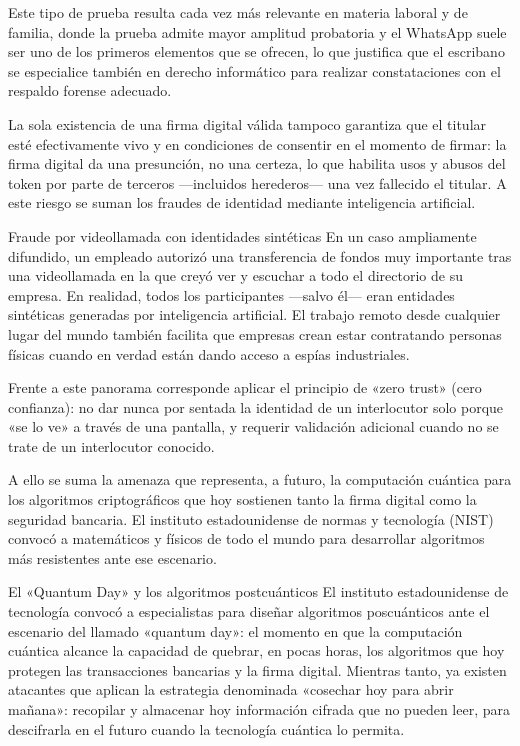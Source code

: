\documentclass[12pt,oneside]{book}
\begin{document}
Este tipo de prueba resulta cada vez más relevante en materia laboral y de familia, donde la prueba admite mayor amplitud probatoria y el WhatsApp suele ser uno de los primeros elementos que se ofrecen, lo que justifica que el escribano se especialice también en derecho informático para realizar constataciones con el respaldo forense adecuado.

La sola existencia de una firma digital válida tampoco garantiza que el titular esté efectivamente vivo y en condiciones de consentir en el momento de firmar: la firma digital da una presunción, no una certeza, lo que habilita usos y abusos del token por parte de terceros ---incluidos herederos--- una vez fallecido el titular. A este riesgo se suman los fraudes de identidad mediante inteligencia artificial.

\begin{example}{Fraude por videollamada con identidades sintéticas}
En un caso ampliamente difundido, un empleado autorizó una transferencia de fondos muy importante tras una videollamada en la que creyó ver y escuchar a todo el directorio de su empresa. En realidad, todos los participantes ---salvo él--- eran entidades sintéticas generadas por inteligencia artificial. El trabajo remoto desde cualquier lugar del mundo también facilita que empresas crean estar contratando personas físicas cuando en verdad están dando acceso a espías industriales.
\end{example}

Frente a este panorama corresponde aplicar el principio de «zero trust» (cero confianza): no dar nunca por sentada la identidad de un interlocutor solo porque «se lo ve» a través de una pantalla, y requerir validación adicional cuando no se trate de un interlocutor conocido.

A ello se suma la amenaza que representa, a futuro, la computación cuántica para los algoritmos criptográficos que hoy sostienen tanto la firma digital como la seguridad bancaria. El instituto estadounidense de normas y tecnología (NIST) convocó a matemáticos y físicos de todo el mundo para desarrollar algoritmos más resistentes ante ese escenario.

\begin{example}{El «Quantum Day» y los algoritmos postcuánticos}
El instituto estadounidense de tecnología convocó a especialistas para diseñar algoritmos poscuánticos ante el escenario del llamado «quantum day»: el momento en que la computación cuántica alcance la capacidad de quebrar, en pocas horas, los algoritmos que hoy protegen las transacciones bancarias y la firma digital. Mientras tanto, ya existen atacantes que aplican la estrategia denominada «cosechar hoy para abrir mañana»: recopilar y almacenar hoy información cifrada que no pueden leer, para descifrarla en el futuro cuando la tecnología cuántica lo permita.
\end{example}
\end{document}
